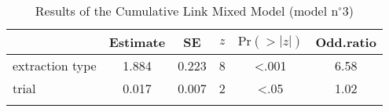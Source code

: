 \begin{table}
\begin{tabular}{l S[table-format=1.3] S[table-format=1.3] S[table-format=1] S[table-format=<1.3] S[table-format=1.2]}
  \lsptoprule
 & {Estimate} & {SE} & {$z$} & {$\text{Pr}(>|z|)$} & {Odd.ratio} \\ 
  \midrule
  extraction type & 1.884 & 0.223 & 8 & <.001 & 6.58 \\ 
  trial & 0.017 & 0.007 & 2 & <.05 & 1.02 \\ 
   \lspbottomrule
\end{tabular}
\caption{Results of the Cumulative Link Mixed Model (model n$^{\circ}$3)}
\label{tab:exp04-m3}
\end{table}
